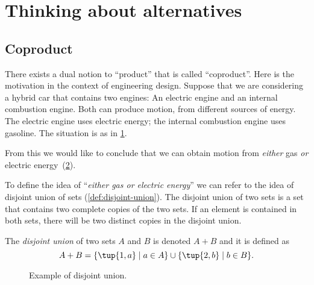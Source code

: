\section{Thinking about alternatives}
\subsection{Coproduct}

There exists a dual notion to ``product'' that is called ``coproduct''. Here is the motivation in the context of engineering design.
Suppose that we are considering a hybrid car that contains two engines: An
electric engine and an internal combustion engine. Both can produce motion, from
different sources of energy. The electric engine uses electric energy; the
internal combustion engine uses gasoline. The situation is as in \cref{fig:e16a}.

\begin{figure}[h!]
    \centering
    \caption{\label{fig:e16a}}
\end{figure}

From this we would like to conclude that we can obtain motion
from \emph{either} gas \emph{or}
electric energy~(\cref{fig:e16b}).

\begin{figure}[h!]
    \centering
    \caption{\label{fig:e16b}}
\end{figure}

To define the idea of ``\emph{either gas \emph{or} electric energy}'' we can
refer to the idea of disjoint union of sets (\cref{def:disjoint-union}). The
disjoint union of two sets is a set that contains two complete copies of the two
sets. If an element is contained in both sets, there will be two distinct copies
in the disjoint union.

\begin{definition}
\label{def:disjoint-union}
    The \emph{disjoint union} of two sets $A$ and $B$ is denoted $A + B$
    and it is defined as
    \begin{equation}
        A + B=\{\tup{1,a}\mid a\in A\}\cup\{\tup{2,b}\mid b\in B\}.
    \end{equation}
\end{definition}


\begin{figure}[h!]
    \begin{center}
    \end{center}
    \caption{Example of disjoint union.}
\end{figure}


